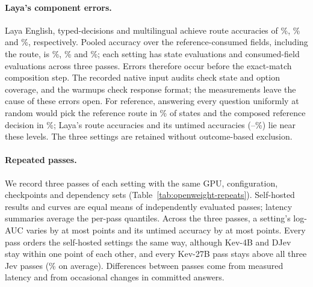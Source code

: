 \paragraph{Laya's component errors.}
Laya English, typed-decisions and multilingual achieve route accuracies of \LayaEnglishRoute\%, \LayaTypedRoute\% and \LayaMultilingualRoute\%, respectively.
Pooled accuracy over the reference-consumed fields, including the route, is \LayaEnglishGoldFields\%, \LayaTypedGoldFields\% and \LayaMultilingualGoldFields\%; each setting has \LayaEnglishStates{} state evaluations and \LayaEnglishFields{} consumed-field evaluations across three passes.
Errors therefore occur before the exact-match composition step. The recorded native input audits check state and option coverage, and the warmups check response format; the measurements leave the cause of these errors open. For reference, answering every question uniformly at random would pick the reference route in \BaselineUniformRoute\% of states and the composed reference decision in \BaselineUniform\%; Laya's route accuracies and its untimed accuracies (\OwLayaMultilingualUntimed--\OwLayaTypedUntimed\%) lie near these levels. The three settings are retained without outcome-based exclusion.

\paragraph{Repeated passes.}
We record three passes of each setting with the same GPU, configuration, checkpoints and dependency sets (Table~\ref{tab:openweight-repeats}). Self-hosted results and curves are equal means of independently evaluated passes; latency summaries average the per-pass quantiles.
Across the three passes, a setting's log-AUC varies by at most \OwRepeatMaxAucRange{} points and its untimed accuracy by at most \OwRepeatMaxUntimedRange{} points. Every pass orders the self-hosted settings the same way, although Kev-4B and DJev stay within one point of each other, and every Kev-27B pass stays above all three Jev passes (\OwKevTwentySevenAuc\% on average).
Differences between passes come from measured latency and from occasional changes in committed answers.

